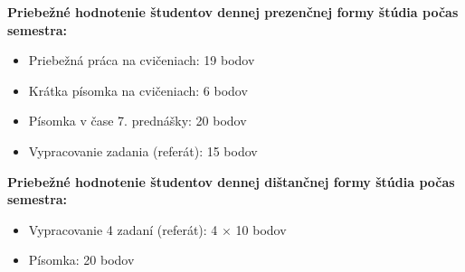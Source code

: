 \documentclass[a4paper, 10pt, ]{article}
\begin{document}
\bigskip

\noindent
\textbf{\textsf{Priebežné hodnotenie študentov dennej prezenčnej formy štúdia počas semestra:}}

\noindent
\begin{itemize}
	\item Priebežná práca na cvičeniach:  19 bodov
	\item Krátka písomka na cvičeniach:  6 bodov
	\item Písomka v čase 7. prednášky:  20 bodov
	\item Vypracovanie zadania (referát):  15 bodov
\end{itemize}


\bigskip

\noindent
\textbf{\textsf{Priebežné hodnotenie študentov dennej dištančnej formy štúdia počas semestra:}}

\noindent
\begin{itemize}
	\item Vypracovanie 4 zadaní (referát):  4 $\times$ 10 bodov
	\item Písomka:  20 bodov
\end{itemize}






\nocite{*}
{}

\end{document}
